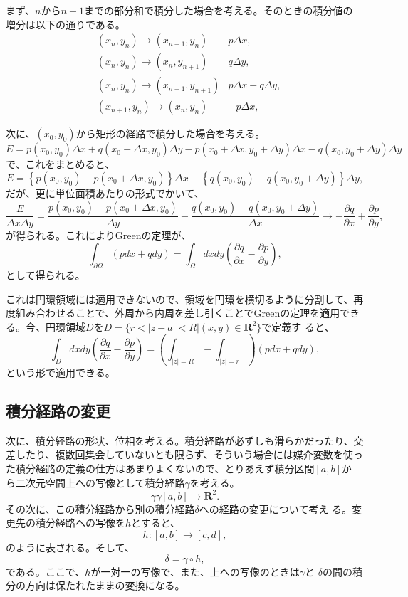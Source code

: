 まず、$n$から$n+1$までの部分和で積分した場合を考える。そのときの積分値の
増分は以下の通りである。
\begin{align}
 &(x_n, y_n) \rightarrow (x_{n+1}, y_n) & p\Delta x, \\
 &(x_n, y_n) \rightarrow (x_n, y_{n+1}) & q\Delta y, \\
 &(x_n, y_n) \rightarrow (x_{n+1}, y_{n+1}) & p\Delta x + q \Delta y, \\
 &(x_{n+1}, y_n) \rightarrow (x_n, y_n) & -p\Delta x,
\end{align}

次に、$(x_0, y_0)$から矩形の経路で積分した場合を考える。
\[
 E = p(x_0, y_0) \Delta x + q (x_0+\Delta x, y_0) \Delta y
  - p(x_0 + \Delta x, y_0 + \Delta y) \Delta x 
  - q(x_0, y_0 + \Delta y) \Delta y 
\]
で、これをまとめると、
\[
  E = \left\{p (x_0, y_0) - p (x_0 + \Delta x, y_0)\right\} \Delta x
  - \left\{q (x_0, y_0) - q (x_0, y_0 + \Delta y)\right\} \Delta y,
 \]
だが、更に単位面積あたりの形式でかいて、
\[
 \frac{E}{\Delta x\Delta y} =
 \frac{p (x_0, y_0) - p (x_0 + \Delta x, y_0)}{\Delta y}
 - \frac{q (x_0, y_0) - q (x_0, y_0 + \Delta y)}{\Delta x} 
 \rightarrow -\frac{\partial q}{\partial x} + \frac{\partial p}{\partial y},
\]
が得られる。これによりGreenの定理が、
\begin{equation}
 \int_{\partial\Omega} (pdx + qdy)
  = \int_{\Omega} dxdy 
  \left(\frac{\partial q}{\partial x} - \frac{\partial p}{\partial y}\right),
\end{equation}
として得られる。

これは円環領域には適用できないので、領域を円環を横切るように分割して、再
度組み合わせることで、外周から内周を差し引くことでGreenの定理を適用でき
る。今、円環領域$D$を$D=\{r < |z-a| < R|(x,y)\in\mathbf{R}^2\}$で定義す
ると、
\begin{equation}
 \int_{D}dxdy\left(
	      \frac{\partial q}{\partial x} 
	      - \frac{\partial p}{\partial y}
	     \right)
 = \left(\int_{|z|=R} - \int_{|z|=r}\right)
 (pdx + qdy),
\end{equation}
という形で適用できる。

\subsection{積分経路の変更}
次に、積分経路の形状、位相を考える。積分経路が必ずしも滑らかだったり、交
差したり、複数回集会していないとも限らず、そういう場合には媒介変数を使っ
た積分経路の定義の仕方はあまりよくないので、とりあえず積分区間$[a, b]$か
ら二次元空間上への写像として積分経路$\gamma$を考える。
\begin{equation}
 \gamma \gamma[a, b] \rightarrow \mathbf{R}^2.
\end{equation}
その次に、この積分経路から別の積分経路$\delta$への経路の変更について考え
る。変更先の積分経路への写像を$h$とすると、
\begin{equation}
 h : [a, b] \rightarrow [c, d],
\end{equation}
のように表される。そして、
\begin{equation}
 \delta = \gamma \circ h,
\end{equation}
である。ここで、$h$が一対一の写像で、また、上への写像のときは$\gamma$と
$\delta$の間の積分の方向は保たれたままの変換になる。

